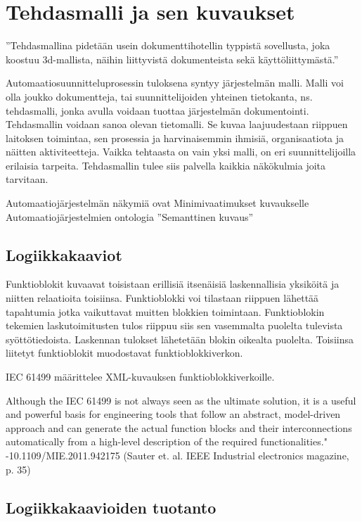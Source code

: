 \documentclass[finnish,12pt]{article}
\begin{document}
	\clearpage
	\section{Tehdasmalli ja sen kuvaukset}

”Tehdasmallina pidetään usein dokumenttihotellin typpistä sovellusta, joka koostuu 3d-mallista, näihin liittyvistä dokumenteista sekä käyttöliittymästä.”

Automaatiosuunnitteluprosessin tuloksena syntyy järjestelmän malli.
Malli voi olla joukko dokumentteja, tai suunnittelijoiden yhteinen tietokanta, ns. tehdasmalli, jonka avulla voidaan tuottaa järjestelmän dokumentointi.
Tehdasmallin voidaan sanoa olevan tietomalli.
Se kuvaa laajuudestaan riippuen laitoksen toimintaa, sen prosessia ja harvinaisemmin ihmisiä, organisaatiota ja näitten aktiviteetteja.
Vaikka tehtaasta on vain yksi malli, on eri suunnittelijoilla erilaisia tarpeita.
Tehdasmallin tulee siis palvella kaikkia näkökulmia joita tarvitaan.  

Automaatiojärjestelmän näkymiä ovat
Minimivaatimukset kuvaukselle
Automaatiojärjestelmien ontologia
”Semanttinen kuvaus”

	\subsection{Logiikkakaaviot}

Funktioblokit kuvaavat toisistaan erillisiä itsenäisiä laskennallisia yksiköitä ja niitten relaatioita toisiinsa.
Funktioblokki voi tilastaan riippuen lähettää tapahtumia jotka vaikuttavat muitten blokkien toimintaan.
Funktioblokin tekemien laskutoimitusten tulos riippuu siis sen vasemmalta puolelta tulevista syöttötiedoista.
Laskennan tulokset lähetetään blokin oikealta puolelta.
Toisiinsa liitetyt funktioblokit muodostavat funktioblokkiverkon. 

IEC 61499 määrittelee XML-kuvauksen funktioblokkiverkoille. 

Although the IEC 61499 is not always seen as the ultimate solution, it is a useful and powerful basis for engineering tools that follow an abstract, model-driven approach and can generate the actual function blocks and their interconnections automatically from a high-level description of the required functionalities." -10.1109/MIE.2011.942175 (Sauter et. al. IEEE Industrial electronics magazine, p. 35)


	\subsection{Logiikkakaavioiden tuotanto}
	
\end{document}
